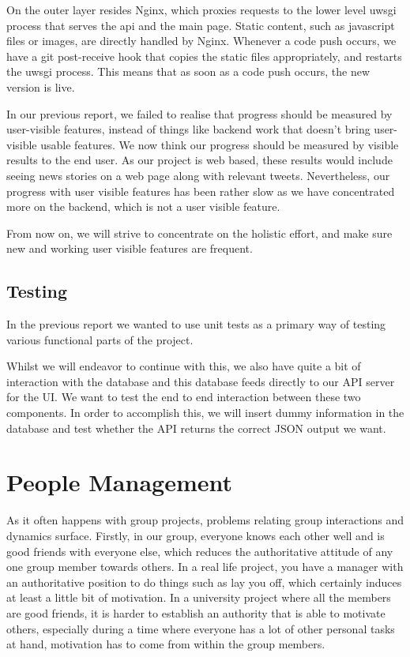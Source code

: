 \documentclass[a4paper,12pt]{article}
\begin{document}
 On the outer layer resides Nginx, which proxies requests to the lower level uwsgi process that serves the api and the main page. Static content, such as javascript files or images, are directly handled by Nginx. Whenever a code push occurs, we have a git post-receive hook that copies the static files appropriately, and restarts the uwsgi process. This means that as soon as a code push occurs, the new version is live.
  
	In our previous report, we failed to realise that progress should be measured by user-visible features, instead of things like backend work that doesn't bring user-visible usable features. We now think our progress should be measured by visible results to the end user. As our project is web based, these results would include seeing news stories on a web page along with relevant tweets. Nevertheless, our progress with user visible features has been rather slow as we have concentrated more on the backend, which is not a user visible feature.

	From now on, we will strive to concentrate on the holistic effort, and make sure new and working user visible features are frequent.
	
	\subsection{Testing}
	
	In the previous report we wanted to use unit tests as a primary way of testing various functional parts of the project. 
	
	Whilst we will endeavor to continue with this, we also have quite a bit of interaction with the database and this database feeds directly to our API server for the UI. We want to test the end to end interaction between these two components. In order to accomplish this, we will insert dummy information in the database and test whether the API returns the correct JSON output we want.
	
	
	\section{People Management}
	
	As it often happens with group projects, problems relating group interactions and dynamics surface. Firstly, in our group, everyone knows each other well and is good friends with everyone else, which reduces the authoritative attitude of any one group member towards others. In a real life project, you have a manager with an authoritative position to do things such as lay you off, which certainly induces at least a little bit of motivation. In a university project where all the members are good friends, it is harder to establish an authority that is able to motivate others, especially during a time where everyone has a lot of other personal tasks at hand, motivation has to come from within the group members.
	
\end{document}
